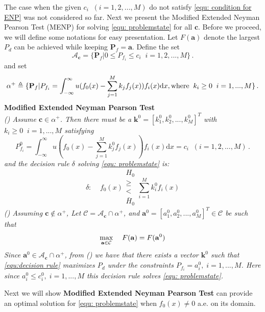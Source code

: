 The case when the given $c_i\;\; (i= 1, 2, ..., M)$ do not satisfy \eqref{equ: condition for ENP} was not considered so far. 
Next we present the Modified Extended Neyman Pearson Test (MENP) for solving \eqref{equ: problemstate} for all $\mathbf{c}$.
Before we proceed, we will define some notations for easy presentation.
Let $F(\mathbf{a})$ denote the largest $P_d$ can be achieved while keeping $\mathbf{P}_f = \mathbf{a}$. 
Define the set 
\[\mathcal{A}_\mathbf{c} = \{
  \mathbf{P}_f | 0 \leq P_{f_i} \leq c_i
  \;\;i=1, 2, ..., M\}\,.
\]
and set 
\[
\alpha^+ \triangleq \{\mathbf{P}_f | P_{f_i} = \int_{-\infty}^{\infty} u(f_0(x) - \sum_{j=1}^{M}k_j f_j(x)) f_i(x) \mathrm{d}x, \text{where\;\;} k_i \geq 0 \;\;i=1, ..., M\}\,.
\]
\noindent \textbf{Modified Extended Neyman Pearson Test}
\noindent \textit{
\\\textnormal{()} Assume $\mathbf{c} \in \alpha^+$. Then there must be a $\mathbf{k}^0 = [k_1^0, k_2^0, ..., k_M^0]^T$ with $k_i \geq 0\;\;i=1, ..., M$ satisfying
}
\begin{equation}
\label{equ:Pf}
  P_{f_i}^0 = \int_{-\infty}^{\infty} u(f_0(x) - \sum_{j=1}^{M}k_j^0f_j(x))f_i(x)\mathrm{d}x = c_i \;\; (i= 1, 2, ..., M)\,.
\end{equation}
\textit{
    and the decision rule $\delta $ solving  \eqref{equ: problemstate} is:
}
\begin{equation}
\label{equ:decision rule}
\delta:\;\;\;\;f_0(x) \substack{H_0 \\ \geq \\ < \\ \bar{H}_0} \sum_{i=1}^{M}k_i^0f_i(x)
\end{equation}
\textit{
\noindent \textnormal{()} Assuming $\mathbf{c} \notin \alpha^+$, Let $\mathcal{C} = \mathcal{A}_{\mathbf{c}} \cap \alpha^+$, and $\mathbf{a}^0 = [a_1^0, a_2^0, ..., a_M^0]^T \in \mathcal{C}$ be such that
}
\begin{equation}
\label{equ: F0}
\max_{\mathbf{a} \in \mathcal{C}}\;\;\;\;F(\mathbf{a}) = F(\mathbf{a}^0)\\
\end{equation}
\textit{
Since $\mathbf{a}^0 \in \mathcal{A}_{\mathbf{c}} \cap \alpha^+$, from \textnormal{()} we have that there exists a vector $\mathbf{k}^0$ such that \eqref{equ:decision rule}  maximizes $P_d$ under the constraints $P_{f_i} = a_i^0, \;i=1, ..., M$. Here since $a_i^0 \leq c_i^0, \;i=1, ..., M$ this decision rule  solves \eqref{equ: problemstate}.
}

Next we will show \textbf{Modified Extended Neyman Pearson Test} can provide an optimal solution for \eqref{equ: problemstate} when $f_0(x) \neq 0$ a.e. on its domain.

